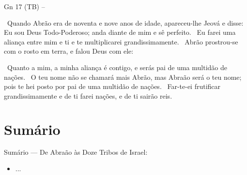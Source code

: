 \documentclass[12pt,aspectratio=169]{beamer}
\newcommand{\ver}[1]{%
    \raisebox{0.50ex}{%
        \scalebox{1.1}{%
            \pmb{\textbf{\textcolor{BSpbg}{#1}}}%
        }%
    }%
}
\newcommand{\QUOTE}[1]{%
    \par\noindent\hspace*{0.05\linewidth}%
    \begin{minipage}{0.9\linewidth}%
        \linespread{1.35}\large{#1}%
    \end{minipage}%
}
\newcommand{\YEL}[1]{{\textcolor{TXyel}{#1}}}
\newcommand{\CYA}[1]{{\textcolor{TXcya}{#1}}}
\newcommand{\BLU}[1]{{\textcolor{TXblu}{#1}}}
\newcommand{\MAG}[1]{{\textcolor{TXmag}{#1}}}
\newcommand{\BRI}[1]{{\textcolor{BSpbg}{#1}}}   %
\begin{document}
    \begin{frame}[allowframebreaks]{\BRI{Gn 17} (TB) --}
        \QUOTE{%
            \ver{1}~Quando Abrão era de \YEL{noventa e nove anos} de idade, apareceu-lhe Jeová e
            disse: \CYA{Eu sou Deus Todo-Poderoso}; \MAG{anda diante de mim e sê perfeito}.
            \ver{2}~\BLU{Eu farei} uma \YEL{aliança} entre mim e ti e te \YEL{multiplicarei
            grandissimamente}.
            \ver{3}~Abrão prostrou-se com o rosto em terra, e falou Deus com ele:
        }

        \pagebreak

        \QUOTE{%
            \ver{4}~Quanto a mim, a minha aliança é contigo, e serás \YEL{pai de uma multidão de
            nações}.
            \ver{5}~O teu nome não se chamará mais Abrão, mas \YEL{Abraão será o teu nome}; pois
            te hei posto por \YEL{pai de uma multidão de nações}.
            \ver{6}~Far-te-ei frutificar grandissimamente e de ti farei \YEL{nações}, e de ti
            sairão \MAG{reis}.
        }

    \end{frame}

\section{Sumário}

    \begin{frame}
        \par\noindent\hspace*{0.05\linewidth}%
        \begin{minipage}{0.9\linewidth}%
            \large%
            \begin{alertblock}{Sumário --- De Abraão às Doze Tribos de Israel:}
                \normalsize
                \begin{itemize}
					\item<1-> ...
                \end{itemize}
            \end{alertblock}
        \end{minipage}%
    \end{frame}
\end{document}

